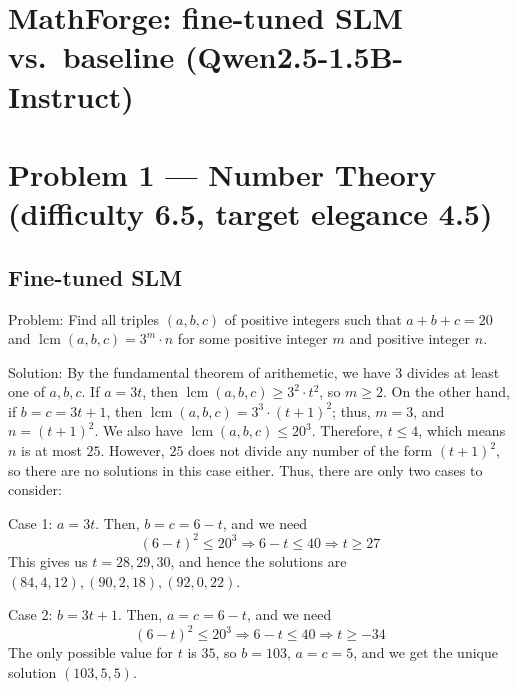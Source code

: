 \documentclass[11pt]{article}
\begin{document}
\section*{MathForge: fine-tuned SLM vs.\ baseline (Qwen2.5-1.5B-Instruct)}

\section*{Problem 1 --- Number Theory (difficulty 6.5, target elegance 4.5)}

\subsection*{Fine-tuned SLM}

Problem:
Find all triples $(a,b,c)$ of positive integers such that $a+b+c=20$ and $\operatorname{lcm}(a,b,c)=3^m \cdot n$ for some positive integer $m$ and positive integer $n$.

Solution:
By the fundamental theorem of arithemetic, we have $3$ divides at least one of $a,b,c$. If $a=3t$, then $\operatorname{lcm}(a,b,c) \geq 3^{2} \cdot t^{2}$, so $m \geq 2$. On the other hand, if $b=c=3t+1$, then $\operatorname{lcm}(a,b,c)=3^{3} \cdot(t+1)^{2}$; thus, $m=3$, and $n=(t+1)^{2}$. We also have $\operatorname{lcm}(a,b,c) \leq 20^{3}$. Therefore, $t \leq 4$, which means $n$ is at most $25$. However, $25$ does not divide any number of the form $(t+1)^{2}$, so there are no solutions in this case either. Thus, there are only two cases to consider:

Case 1: $a=3t$. Then, $b=c=6-t$, and we need $$(6-t)^{2} \leq 20^{3} \Longrightarrow 6-t \leq 40 \Longrightarrow t \geq 27$$ This gives us $t=28,29,30$, and hence the solutions are $(84,4,12),(90,2,18),(92,0,22)$.

Case 2: $b=3t+1$. Then, $a=c=6-t$, and we need $$(6-t)^{2} \leq 20^{3} \Longrightarrow 6-t \leq 40 \Longrightarrow t \geq -34$$ The only possible value for $t$ is $35$, so $b=103$, $a=c=5$, and we get the unique solution $(103,5,5)$.
\end{document}
